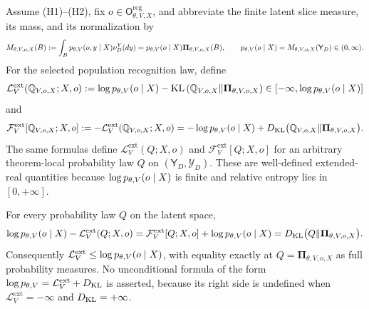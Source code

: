 Assume (H1)--(H2), fix $o\in\mathsf O_{\theta,V,X}^{\mathrm{reg}}$, and abbreviate the finite latent slice measure, its mass, and its normalization by
\begin{equation}
M_{\theta,V,o,X}(B)
:=\int_Bp_{\theta,V}(o,y\mid X)\nu_D^Y(dy)
=p_{\theta,V}(o\mid X)\boldsymbol\Pi_{\theta,V,o,X}(B),
\qquad
p_{\theta,V}(o\mid X)
=M_{\theta,V,o,X}(\mathsf Y_D)\in(0,\infty).
\label{eq:elbo-slice-measure}
\end{equation}
For the selected population recognition law, define
\begin{equation}
\mathcal L_V^{\mathrm{ext}}(\mathbb Q_{V,o,X};X,o)
:=
\log p_{\theta,V}(o\mid X)
-
\operatorname{KL}
\left(
\mathbb Q_{V,o,X}
\middle\Vert
\boldsymbol\Pi_{\theta,V,o,X}
\right)
\in[-\infty,\log p_{\theta,V}(o\mid X)]
\label{eq:elbo-extended-definition}
\end{equation}
and
\begin{equation}
\mathcal F_V^{\mathrm{ext}}[\mathbb Q_{V,o,X};X,o]
:=-\mathcal L_V^{\mathrm{ext}}(\mathbb Q_{V,o,X};X,o)
=-\log p_{\theta,V}(o\mid X)
+D_{\mathrm{KL}}\bigl(\mathbb Q_{V,o,X}\Vert
\boldsymbol\Pi_{\theta,V,o,X}\bigr).
\label{eq:elbo-extended-free-energy}
\end{equation}
The same formulas define \(\mathcal L_V^{\mathrm{ext}}(Q;X,o)\) and \(\mathcal F_V^{\mathrm{ext}}[Q;X,o]\) for an arbitrary theorem-local probability law \(Q\) on \((\mathsf Y_D,\mathscr Y_D)\). These are well-defined extended-real quantities because \(\log p_{\theta,V}(o\mid X)\) is finite and relative entropy lies in \([0,+\infty]\). 

\medskip
{}
For every probability law $Q$ on the latent space,
\begin{equation}
\log p_{\theta,V}(o\mid X)-\mathcal L_V^{\mathrm{ext}}(Q;X,o)
=\mathcal F_V^{\mathrm{ext}}[Q;X,o]+\log p_{\theta,V}(o\mid X)
=D_{\mathrm{KL}}\bigl(Q\Vert\boldsymbol\Pi_{\theta,V,o,X}\bigr).
\label{eq:elbo-extended-gap}
\end{equation}
Consequently \(\mathcal L_V^{\mathrm{ext}}\leq\log p_{\theta,V}(o\mid X)\), with equality exactly at \(Q=\boldsymbol\Pi_{\theta,V,o,X}\) as full probability measures. No unconditional formula of the form \(\log p_{\theta,V}=\mathcal L_V^{\mathrm{ext}}+D_{\mathrm{KL}}\) is asserted, because its right side is undefined when \(\mathcal L_V^{\mathrm{ext}}=-\infty\) and \(D_{\mathrm{KL}}=+\infty\). 

